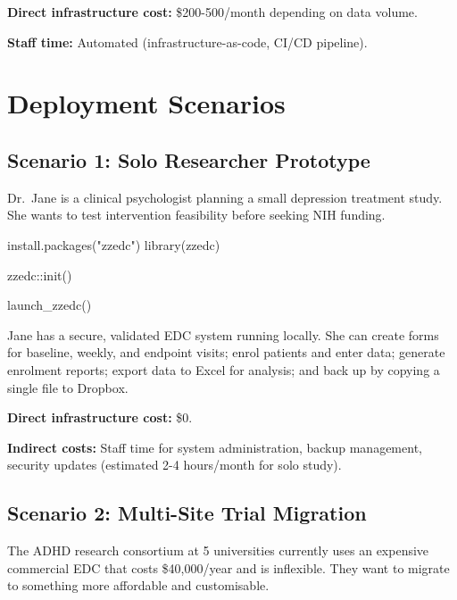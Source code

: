 \documentclass[
  letterpaper,
  DIV=11,
  numbers=noendperiod]{scrartcl}
\newenvironment{Shaded}{\begin{snugshade}}{\end{snugshade}}
\newcommand{\FunctionTok}[1]{\textcolor[rgb]{0.28,0.35,0.67}{#1}}
\newcommand{\NormalTok}[1]{\textcolor[rgb]{0.00,0.23,0.31}{#1}}
\newcommand{\SpecialCharTok}[1]{\textcolor[rgb]{0.37,0.37,0.37}{#1}}
\newcommand{\StringTok}[1]{\textcolor[rgb]{0.13,0.47,0.30}{#1}}
\begin{document}
\textbf{Direct infrastructure cost:} \$200-500/month depending on data
volume.

\textbf{Staff time:} Automated (infrastructure-as-code, CI/CD pipeline).

\section{Deployment Scenarios}\label{deployment-scenarios}

\subsection{Scenario 1: Solo Researcher
Prototype}\label{scenario-1-solo-researcher-prototype}

Dr.~Jane is a clinical psychologist planning a small depression
treatment study. She wants to test intervention feasibility before
seeking NIH funding.

\begin{Shaded}
\begin{Highlighting}[]
\FunctionTok{install.packages}\NormalTok{(}\StringTok{"zzedc"}\NormalTok{)}
\FunctionTok{library}\NormalTok{(zzedc)}

\NormalTok{zzedc}\SpecialCharTok{::}\FunctionTok{init}\NormalTok{()}

\FunctionTok{launch\_zzedc}\NormalTok{()}
\end{Highlighting}
\end{Shaded}

Jane has a secure, validated EDC system running locally. She can create
forms for baseline, weekly, and endpoint visits; enrol patients and
enter data; generate enrolment reports; export data to Excel for
analysis; and back up by copying a single file to Dropbox.

\textbf{Direct infrastructure cost:} \$0.

\textbf{Indirect costs:} Staff time for system administration, backup
management, security updates (estimated 2-4 hours/month for solo study).

\subsection{Scenario 2: Multi-Site Trial
Migration}\label{scenario-2-multi-site-trial-migration}

The ADHD research consortium at 5 universities currently uses an
expensive commercial EDC that costs \$40,000/year and is inflexible.
They want to migrate to something more affordable and customisable.
\end{document}
